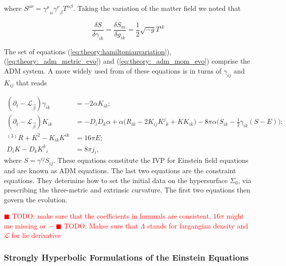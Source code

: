 \documentclass[11pt,a4paper,headinclude=true,DIV=14,BCOR=8mm,chapterprefix,listof=totoc,twoside,openright,abstracton]{scrbook}
\newcommand{\todo}[1]{\textcolor{red}{$\blacksquare$ TODO: #1}}
\begin{document}
where $S^{\mu\nu}={\gamma^{\mu}}_{\alpha}{\gamma^{\nu}}_{\beta}T^{\alpha\beta}$. 
Taking the variation of the matter field we noted that 


\begin{equation}
    \frac{\delta S}{\delta \gamma_{ik}} = \frac{\delta S_m}{\delta g_{ik}} = \frac{1}{2}\sqrt{-g}T^{ik}
\end{equation}

The set of equations (\ref{eq:theory:hamiltonianvariation}), (\ref{eq:theory:_adm_metric_evo}) and (\ref{eq:theory:_adm_mom_evo}) comprise the ADM system. A more widely used from of these equations is in turns of $\gamma_{ij}$ and $K_{ij}$ that reads

\begin{align}
    (\partial_t - \mathcal{L}_{\vec{\beta}})\gamma_{ik} &= -2\alpha K_{ik}; \\
    (\partial_t - \mathcal{L}_{\vec{\beta}})K_{ik} &= -D_{i}D_{k}\alpha + \alpha\big(R_{ik} - 2K_{ij}{K^j}_k+KK_{ik}\big) - 8\pi\alpha\big(S_{ik} - \frac{1}{2}\gamma_{ik}(S-E)\big); \\
    {^{(3)}R} + K^2 - K_{ik}K^{ik} &= 16\pi E; \\
    D_{i}K-D_{k}{K^k}_i &= 8\pi j_i,
    \label{eq:theory:adm}
\end{align}
where $S = \gamma^{ij}S_{ij}$.
These equations constitute the IVP for Einstein field equations and are known as ADM equations. The last two equations are the constraint equations. They determine how to set the initial data on the hypersurface $\Sigma_0$, via prescribing the three-metric and extrinsic curvature. The first two equations then govern the evolution.

\todo{make sure that the coefficients in formuals are consistent, $16\pi$ might me missing or $-$}
\todo{Makse sure that $\Lambda$ stands for largangian density and $\mathcal{L}$ for lie derivative}

\subsubsection{Strongly Hyperbolic Formulations of the Einstein Equations}
\end{document}

